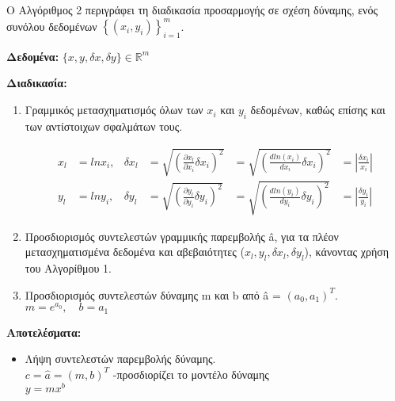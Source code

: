 \begin{refsection}
\noindent Ο Αλγόριθμος 2 περιγράφει τη διαδικασία προσαρμογής σε σχέση δύναμης, ενός συνόλου δεδομένων $\left\{(x_i, y_i)\right\}_{i = 1}^m$.

\begin{tcolorbox}[breakable, fonttitle=\bfseries, title=Αλγόριθμος 2: Μοντελοποίηση δεδομένων σε σχέση δύναμης]

\large \textbf{Δεδομένα:} $\{x, y, \delta x, \delta y \} \in \mathbb{R}^m$

\large \textbf{Διαδικασία:}
\begin{enumerate}
\item Γραμμικός μετασχηματισμός όλων των $x_i$ και $y_i$ δεδομένων, καθώς επίσης και των αντίστοιχων σφαλμάτων τους.

\begin{align*}
x_l &= ln x_i, & \delta x_l &= \sqrt{\left(\frac{\partial x_l}{\partial x_i} \delta x_i\right)^2} &= \sqrt{\left(\frac{d ln(x_i)}{d x_i} \delta x_i\right)^2} &= \left|\frac{\delta x_i}{x_i}\right| \\
y_l &= ln y_i, & \delta y_l &= \sqrt{\left(\frac{\partial y_l}{\partial y_i} \delta y_i\right)^2} &= \sqrt{\left(\frac{d ln(y_i)}{d y_i} \delta y_i\right)^2} &= \left|\frac{\delta y_i}{y_i}\right|
\end{align*}

\item Προσδιορισμός συντελεστών γραμμικής παρεμβολής \^{a}, για τα πλέον μετασχηματισμένα δεδομένα και αβεβαιότητες ($x_l, y_l, \delta x_l, \delta y_l$), κάνοντας χρήση του Αλγορίθμου 1.

\item Προσδιορισμός συντελεστών δύναμης m και b από \^{a} = $(a_0, a_1)^T$.\\ $m = e^{a_0}, \quad b = a_1$
\end{enumerate}

\large \textbf{Αποτελέσματα:}
\begin{itemize}
\item Λήψη συντελεστών παρεμβολής δύναμης.\\ $ c = \hat{a} = (m, b)^T $ \hfill -προσδιορίζει το μοντέλο δύναμης\\ \phantom{a} \hfill $y = mx^b$
\end{itemize}

\end{tcolorbox}

\printbibheading
\begin{english}
\printbibliography[heading=subbibliography, type = book, title = {Βιβλία}]
\printbibliography[heading=subbibliography, type = inbook, title = {Κεφάλαια βιβλίων}]
\printbibliography[heading = subbibliography, type = article, title = {Δημοσιεύσεις}]
\printbibliography[heading=subbibliography, type = misc, title = {Ξένος κώδικας}]
\end{english}

\end{refsection}